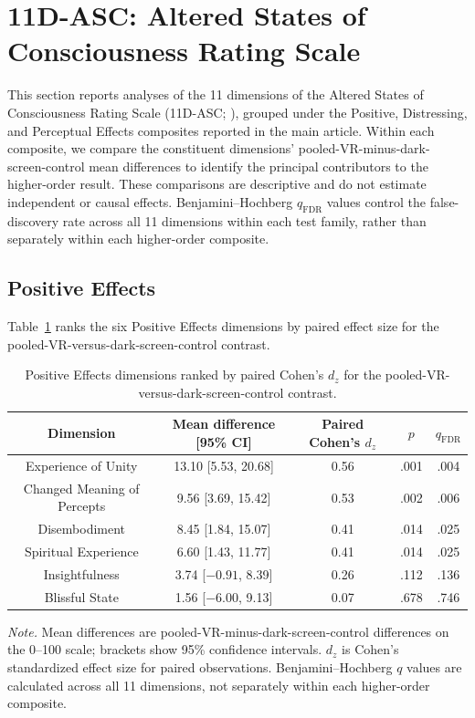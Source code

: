 \documentclass[pdflatex,sn-basic,lineno]{../sn-jnl}
\begin{document}
\section{11D-ASC: Altered States of Consciousness Rating Scale}
\label{sec:supp_asc}

This section reports analyses of the 11 dimensions of the Altered States of Consciousness Rating Scale (11D-ASC; \citealt{studerus2010}), grouped under the Positive, Distressing, and Perceptual Effects composites reported in the main article. Within each composite, we compare the constituent dimensions' pooled-VR-minus-dark-screen-control mean differences to identify the principal contributors to the higher-order result. These comparisons are descriptive and do not estimate independent or causal effects. Benjamini--Hochberg $q_{\mathrm{FDR}}$ values control the false-discovery rate across all 11 dimensions within each test family, rather than separately within each higher-order composite.

\subsection{Positive Effects}
\label{subsec:supp_asc_positive}

Table~\ref{tab:supp_asc_positive_drivers} ranks the six Positive Effects dimensions by paired effect size for the pooled-VR-versus-dark-screen-control contrast.

\begin{table}[!htbp]
\centering
\small
\setlength{\tabcolsep}{3pt}
\caption{Positive Effects dimensions ranked by paired Cohen's $d_z$ for the pooled-VR-versus-dark-screen-control contrast.}
\label{tab:supp_asc_positive_drivers}
\begin{tabular*}{\textwidth}{@{\extracolsep{\fill}}ccccc@{}}
\toprule
Dimension & Mean difference [95\% CI] & Paired Cohen's $d_z$ & $p$ & $q_{\mathrm{FDR}}$ \\
\midrule
Experience of Unity & 13.10 [5.53, 20.68] & 0.56 & .001 & .004 \\
Changed Meaning of Percepts & 9.56 [3.69, 15.42] & 0.53 & .002 & .006 \\
Disembodiment & 8.45 [1.84, 15.07] & 0.41 & .014 & .025 \\
Spiritual Experience & 6.60 [1.43, 11.77] & 0.41 & .014 & .025 \\
Insightfulness & 3.74 [$-0.91$, 8.39] & 0.26 & .112 & .136 \\
Blissful State & 1.56 [$-6.00$, 9.13] & 0.07 & .678 & .746 \\
\bottomrule
\end{tabular*}
\par\smallskip
\parbox{\textwidth}{\footnotesize\textit{Note.} Mean differences are pooled-VR-minus-dark-screen-control differences on the 0--100 scale; brackets show 95\% confidence intervals. $d_z$ is Cohen's standardized effect size for paired observations. Benjamini--Hochberg $q$ values are calculated across all 11 dimensions, not separately within each higher-order composite.}
\end{table}
\FloatBarrier
\end{document}
